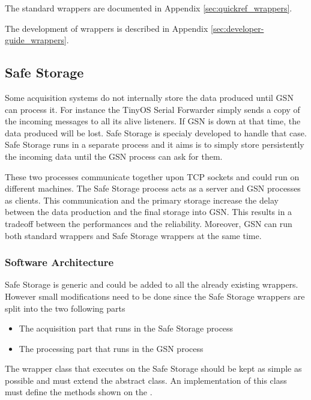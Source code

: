 The standard \gsn wrappers are documented in Appendix \ref{sec:quickref_wrappers}.

The development of \gsn wrappers is described in Appendix \ref{sec:developer-guide_wrappers}.

\subsection{Safe Storage \label{safe_storage}}

Some acquisition systems do not internally store the data produced until GSN can process it. For instance 
the TinyOS Serial Forwarder simply sends a copy of the incoming messages to all its alive listeners. If GSN is down 
at that time, the data produced will be lost. Safe Storage is specialy developed to handle that case.
Safe Storage runs in a separate process and it aims is to simply store persistently the incoming data until the GSN process can ask for them.

These two processes communicate together upon TCP sockets and could run on different machines. The Safe Storage process acts as 
a server and GSN processes as clients. This communication and the primary storage increase the delay between the data production and the 
final storage into GSN. This results in a tradeoff between the performances and the reliability.
Moreover, GSN can run both standard wrappers and Safe Storage wrappers at the same time.

\subsubsection{Software Architecture}

Safe Storage is generic and could be added to all the already existing wrappers.
However small modifications need to be done since the Safe Storage wrappers are split into the two following parts

\begin{itemize}
	\item The acquisition part that runs in the Safe Storage process
	\item The processing part that runs in the GSN process
\end{itemize}

The wrapper class that executes on the Safe Storage should be kept as simple as possible and must extend the
 abstract class.
An implementation of this class must define the methods shown on the .

